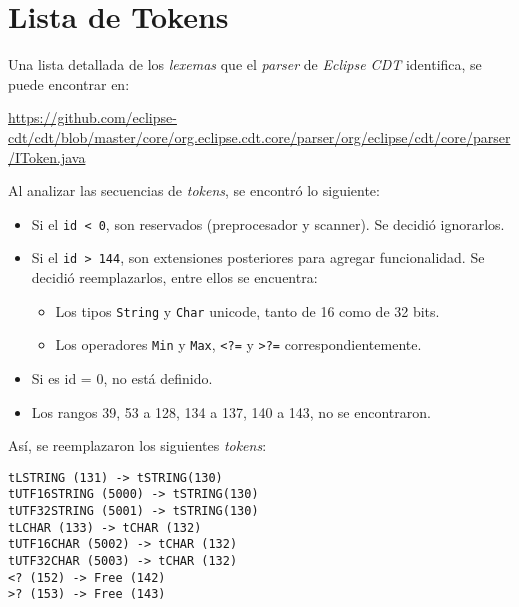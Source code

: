 \chapter{Lista de Tokens}
\label{ape:tok}

Una lista detallada de los \textit{lexemas} que el \textit{parser} de \textit{Eclipse CDT} identifica,
se puede encontrar en:

\url{https://github.com/eclipse-cdt/cdt/blob/master/core/org.eclipse.cdt.core/parser/org/eclipse/cdt/core/parser/IToken.java}

Al analizar las secuencias de \textit{tokens}, se encontró lo siguiente:

\begin{itemize}
  \item Si el \lstinline{id < 0}, son reservados (preprocesador y scanner). Se decidió ignorarlos.
  \item Si el \lstinline{id > 144}, son extensiones posteriores para agregar funcionalidad.
  Se decidió reemplazarlos, entre ellos se encuentra:
  \begin{itemize}
	\item Los tipos \lstinline{String} y \lstinline{Char} unicode, tanto de 16 como de 32 bits.
	\item Los operadores \lstinline{Min} y \lstinline{Max}, \lstinline{<?=} y \lstinline{>?=} correspondientemente.
  \end{itemize}
  \item Si es id = 0, no está definido.
  \item Los rangos 39, 53 a 128, 134 a 137, 140 a 143, no se encontraron.
\end{itemize}

Así, se reemplazaron los siguientes \textit{tokens}:

\begin{lstlisting}[caption={Preprocesamiento de Tokens.}]
tLSTRING (131) -> tSTRING(130)
tUTF16STRING (5000) -> tSTRING(130)
tUTF32STRING (5001) -> tSTRING(130)
tLCHAR (133) -> tCHAR (132)
tUTF16CHAR (5002) -> tCHAR (132)
tUTF32CHAR (5003) -> tCHAR (132)
<? (152) -> Free (142)
>? (153) -> Free (143)
\end{lstlisting}
